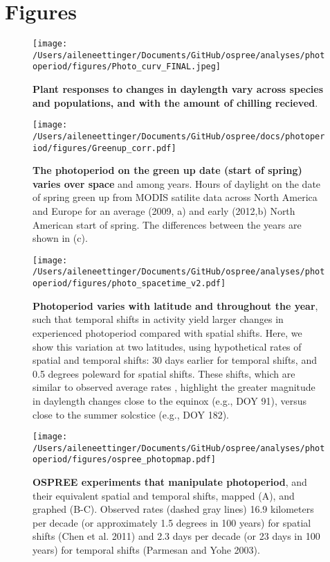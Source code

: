 \documentclass{article}
\begin{document}
\section* {Figures}
\begin{figure}[p]
\texttt{[image: /Users/aileneettinger/Documents/GitHub/ospree/analyses/photoperiod/figures/Photo\_curv\_FINAL.jpeg]} 
\caption{\textbf{Plant responses to changes in daylength vary across species and populations, and with the amount of chilling recieved}.}
 \label{fig:photocurve}
 \end{figure}

\begin{figure}[p]
\centering
\texttt{[image: /Users/aileneettinger/Documents/GitHub/ospree/docs/photoperiod/figures/Greenup\_corr.pdf]} %
\caption{\textbf{The photoperiod on the green up date (start of spring) varies over space} and among years. Hours of daylight on the date of spring green up from MODIS satilite data across North America and Europe for an average (2009, a) and  early (2012,b) North American start of spring. The differences between the years are shown in (c). }
 \label{fig:greenup}%
 \end{figure}


\begin{figure}[p]
\centering
\texttt{[image: /Users/aileneettinger/Documents/GitHub/ospree/analyses/photoperiod/figures/photo\_spacetime\_v2.pdf]} %
\caption{\textbf{Photoperiod varies with latitude and throughout the year}, such that temporal shifts in activity yield larger changes in experienced photoperiod compared with spatial shifts. Here, we show this variation at two latitudes, using hypothetical rates of spatial and temporal shifts: 30 days earlier for temporal shifts, and 0.5 degrees poleward for spatial shifts. These shifts, which are similar to observed average rates \citep[e.g.,][]{parmesan2006,chen2011}, highlight the greater magnitude in daylength changes close to the equinox (e.g., DOY 91), versus close to the summer solcstice (e.g., DOY 182).}
 \label{fig:spacetime}%
 \end{figure}
 
\begin{figure}[p]
\centering
\texttt{[image: /Users/aileneettinger/Documents/GitHub/ospree/analyses/photoperiod/figures/ospree\_photopmap.pdf]} 
\caption{\textbf{OSPREE experiments that manipulate photoperiod}, and their equivalent spatial and temporal shifts, mapped (A), and graphed (B-C). Observed rates (dashed gray lines) 16.9 kilometers per decade (or approximately 1.5 degrees in 100 years) for spatial shifts (Chen et al. 2011) and 2.3 days per decade (or 23 days in 100 years) for temporal shifts (Parmesan and Yohe 2003).}
 \label{fig:photomap}
 \end{figure}
\end{document}
